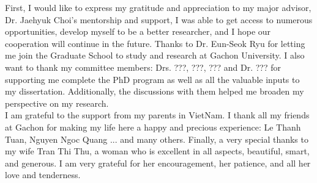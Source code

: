 
\begin{acknowledgements}       
First, I would like to express my gratitude and appreciation to my major advisor, Dr. Jaehyuk Choi’s mentorship and support, I was able to get access to numerous opportunities, develop myself to be a better researcher, and I hope our cooperation will continue in the future. Thanks to Dr. Eun-Seok Ryu for letting me join the Graduate School to study and research at Gachon University. I also want to thank my committee members: Drs. ???, ???, ???
and Dr. ??? for supporting me complete the PhD program as well as all the valuable inputs to my dissertation. Additionally, the discussions with them helped me broaden my perspective on my research.\\
I am grateful to the support from my parents in VietNam. I thank all my friends at Gachon
for making my life here a happy and precious experience: Le Thanh Tuan, Nguyen Ngoc Quang ... and many others.
Finally, a very special thanks to my wife Tran Thi Thu, a woman who is excellent in
all aspects, beautiful, smart, and generous. I am very grateful for her encouragement,
her patience, and all her love and tenderness.
\end{acknowledgements}
